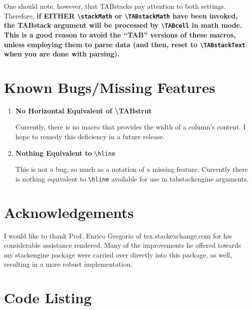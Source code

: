 \documentclass{article}
\begin{document}
One should note, however, that TABstacks pay attention to both settings.  Therefore, 
\bfseries if EITHER \verb|\stackMath| or \verb|\TABstackMath| have been
invoked, the TABstack argument will be processed by \verb|\TABcell| in math 
mode\mdseries.  This is a good reason to avoid the ``TAB'' versions of these 
macros, unless employing them to parse data (and then, reset to 
\verb|\TABstackText| when you are done with parsing).

\section{Known Bugs/Missing Features}

\begin{enumerate}

\item \textbf{No Horizontal Equivalent of \textbackslash TABstrut}

Currently, there is no macro that provides the width of a
column's content.  I hope to remedy this deficiency in a future release.

\item \textbf{Nothing Equivalent to} \verb|\hline|

This is not a bug, so much as a notation of a missing feature.  Currently
there is nothing equivalent to \verb|\hline| available for use in 
\textsf{tabstackengine} arguments.

\end{enumerate}

\section*{Acknowledgements}

I would like to thank Prof. Enrico Gregorio of \textsf{tex.stackexchange.com} for
his considerable assistance rendered.  Many of the improvements he offered towards 
my \textsf{stackengine} package were carried over directly into this package, as
well, resulting in a more robust implementation.

\clearpage
\section{Code Listing}

\end{document}
